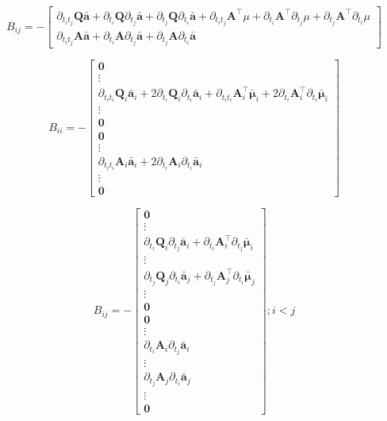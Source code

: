 \documentclass[mat2, tisk]{fmfdelo}
\newcommand{\aimplicit}{\bar{\mathbf{a}}}
\newcommand{\muimplicit}{\bar{\mathbf{\mu}}}
\newcommand{\qmat}{\mathbf{Q}}
\newcommand{\amat}{\mathbf{A}}
\begin{document}
\begin{equation}
    B_{ij} = -\begin{bmatrix}
        \partial_{t_it_j}\qmat\aimplicit + \partial_{t_i}\qmat\partial_{t_j}\aimplicit + \partial_{t_j}\qmat\partial_{t_i}\aimplicit + \partial_{t_it_j} \amat^{\top}\mu + \partial_{t_i}\amat^{\top}\partial_{t_j}\mu + \partial_{t_j}\amat^{\top}\partial_{t_i}\mu \\
        \partial_{t_it_j}\amat\aimplicit + \partial_{t_i}\amat\partial_{t_j}\aimplicit + \partial_{t_j}\amat\partial_{t_i}\aimplicit
    \end{bmatrix}
\end{equation}

\begin{equation}
    B_{ii} = - \begin{bmatrix}
        \mathbf{0} \\
        \vdots \\
        \partial_{t_it_i}\qmat_i\aimplicit_i + 2\partial_{t_i}\qmat_i\partial_{t_i}\aimplicit_i + \partial_{t_it_i} \amat_i^{\top}\muimplicit_i + 2\partial_{t_i}\amat_i^{\top}\partial_{t_i}\muimplicit_i \\
        \vdots \\
        \mathbf{0} \\
        \mathbf{0} \\
        \vdots \\
        \partial_{t_it_i}\amat_i\aimplicit_i + 2\partial_{t_i}\amat_i\partial_{t_i}\aimplicit_i\\
        \vdots \\
        \mathbf{0}
    \end{bmatrix}
\end{equation}

\begin{equation}
    B_{ij} = - \begin{bmatrix}
        \mathbf{0} \\
        \vdots \\
        \partial_{t_i}\qmat_i\partial_{t_j}\aimplicit_i + \partial_{t_i}\amat_i^{\top}\partial_{t_j}\muimplicit_i \\
        \vdots \\
        \partial_{t_j}\qmat_j\partial_{t_i}\aimplicit_j + \partial_{t_j}\amat_j^{\top}\partial_{t_i}\muimplicit_j \\
        \vdots \\
        \mathbf{0} \\
        \mathbf{0} \\
        \vdots \\
        \partial_{t_i}\amat_i\partial_{t_j}\aimplicit_i\\
        \vdots \\
        \partial_{t_j}\amat_j\partial_{t_i}\aimplicit_j\\
        \vdots \\
        \mathbf{0}
    \end{bmatrix}; i < j
\end{equation}
\end{document}
